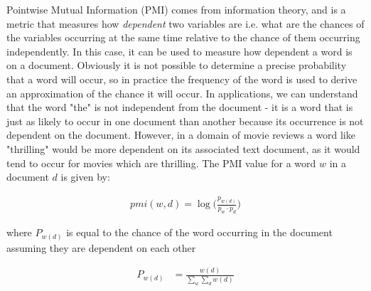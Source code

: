 



Pointwise Mutual Information (PMI) comes from  information theory, and is a metric that measures how \textit{dependent}  two variables are i.e. what are the chances of the variables occurring  at the same time  relative to the chance of them occurring independently. In this case, it can be used to measure how dependent a word is on a document. Obviously it is not possible to determine a precise probability that a word will occur, so in practice the frequency of the word is used to derive an approximation of the chance it will occur. In applications, we can understand that the word "the" is not independent from the document - it is a word that is just as likely to occur in one document than another because its occurrence is not dependent on the document. However, in a domain of movie reviews a word like "thrilling" would be more dependent on its associated text document, as it would tend to occur for movies which are thrilling. The PMI value for a word $w$ in a document  $d$ is given by:


\begin{align*}
\textit{pmi}(w, d) = \log\big(\frac{p_{{w}(d)}}{p_{w} \cdotp p_{d}}\big)
\end{align*}

where $P_{{w}(d)}$ is equal to the chance of the word occurring in the document assuming they are dependent on each other 



\begin{align*}
P_{{w}(d)} &= \frac{{w}(d)}{\sum_{w} \sum_{d} {w}(d)}
\end{align*}

